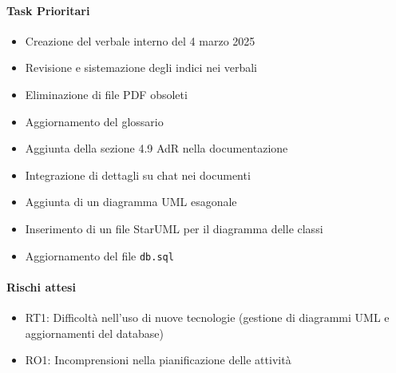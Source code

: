 \documentclass{article}
\begin{document}
            \paragraph{Task Prioritari}
            \begin{itemize}
                \item Creazione del verbale interno del 4 marzo 2025
                \item Revisione e sistemazione degli indici nei verbali
                \item Eliminazione di file PDF obsoleti
                \item Aggiornamento del glossario
                \item Aggiunta della sezione 4.9 AdR nella documentazione
                \item Integrazione di dettagli su chat nei documenti
                \item Aggiunta di un diagramma UML esagonale
                \item Inserimento di un file StarUML per il diagramma delle classi
                \item Aggiornamento del file \texttt{db.sql}
            \end{itemize}
            
            \paragraph{Rischi attesi}
            \begin{itemize}
                \item RT1: Difficoltà nell’uso di nuove tecnologie (gestione di diagrammi UML e aggiornamenti del database)
                \item RO1: Incomprensioni nella pianificazione delle attività
            \end{itemize}
\end{document}
